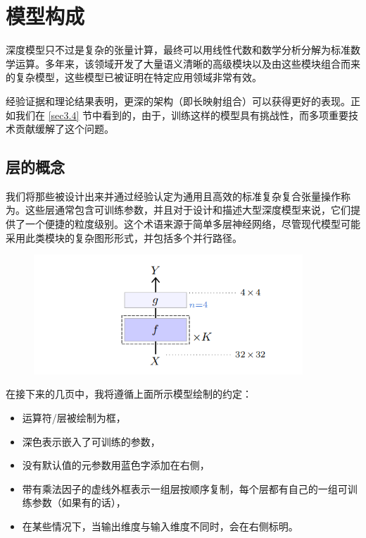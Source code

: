 \chapter{模型构成}\label{ch4}

深度模型只不过是复杂的张量计算，最终可以用线性代数和数学分析分解为标准数学运算。多年来，该领域开发了大量语义清晰的高级模块以及由这些模块组合而来的复杂模型，这些模型已被证明在特定应用领域非常有效。

经验证据和理论结果表明，更深的架构（即长映射组合）可以获得更好的表现。正如我们在 \ref{sec3.4} 节中看到的，由于，训练这样的模型具有挑战性，而多项重要技术贡献缓解了这个问题。

\section{层的概念}\label{sec4.1}

我们将那些被设计出来并通过经验认定为通用且高效的标准复杂复合张量操作称为。这些层通常包含可训练参数，并且对于设计和描述大型深度模型来说，它们提供了一个便捷的粒度级别。这个术语来源于简单多层神经网络，尽管现代模型可能采用此类模块的复杂图形形式，并包括多个并行路径。

\begin{figure}[h]
    \centering
    \includegraphics[width=0.9\textwidth]{fig/fig4.0.png}
\end{figure}

在接下来的几页中，我将遵循上面所示模型绘制的约定：

\begin{itemize}
    \item 运算符/层被绘制为框，
    \item 深色表示嵌入了可训练的参数，
    \item 没有默认值的元参数用蓝色字添加在右侧，
    \item 带有乘法因子的虚线外框表示一组层按顺序复制，每个层都有自己的一组可训练参数（如果有的话），
    \item 在某些情况下，当输出维度与输入维度不同时，会在右侧标明。
\end{itemize}

